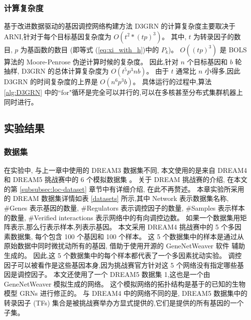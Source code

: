 \subsubsection{计算复杂度}

基于改进数据驱动的基因调控网络构建方法 D3GRN 的计算复杂度主要取决于 ARNI,针对于每个目标基因复杂度为 $O(t^2*(tp)^3)$。
其中, $t$ 为转录因子的数目, $p$ 为基函数的数目 (即等式 (\ref{eq:xi_with_h})中的 $P_k$)。
$O((tp)^3)$ 是 BOLS 算法的 Moore-Penrose 伪逆计算时候的复杂度。
因此,针对 $n$ 个目标基因和 $b$ 轮抽样, D3GRN 的总体计算复杂度为 $O(t^5p^3nb)$。
由于 $t$ 通常比 $n$ 小得多,因此 D3GRN 的时间复杂度的上界是 $O(n^6p^3b)$。
具体运行的过程中,算法 \ref{alg:D3GRN} 中的``for"循环是完全可以并行的,可以在多核甚至分布式集群机器上同时进行。

\subsection{实验结果}

\subsubsection{数据集}

在实验中, 与上一章中使用的 DREAM3 数据集不同,
本文使用的是来自 DREAM4 和 DREAM5 挑战赛中的 6 个模拟数据集 。
关于 DREAM 挑战赛的介绍, 在本文的第 \ref{subsubsec:loc-dataset} 章节中有详细介绍, 在此不再赘述。
本章实验所采用的 DREAM 数据集详情如表 \ref{datasets} 所示,其中 Network 表示数据集名称,
\#Genes 表示基因的数量, \#Regulators 表示调控因子的数量, \#Samples 表示样本的数量, 
\#Verified interactions 表示网络中的有向调控边数。
如果一个数据集用矩阵表示,那么行表示样本,列表示基因。
本文采用 DREAM4 挑战赛中的 5 个多因素数据集,
每个包含 100 个基因和 100 个样本。
这 5 个数据集中的样本是通过从原始数据中同时微扰动所有的基因, 借助于使用开源的 GeneNetWeaver 软件  辅助生成的。
因此,这 5 个数据集中的每个样本都代表了一个多因素扰动实验。
调控因子可以被看作是这些基因本身,因为挑战赛官方针对这 5 个网络没有指定哪些基因是调控因子。
本文还使用了一个 DREAM5 数据集 1,这也是一个由 GeneNetWeaver 模拟生成的网络。
这个模拟网络的拓扑结构是基于的已知的生物模型 GRNs 进行修正的。
与 DREAM4 中的网络不同的是,
DREAM5 数据集中的转录因子 (TFs) 集合是被挑战赛举办方显式提供的,它们是提供的所有基因的一个子集。


